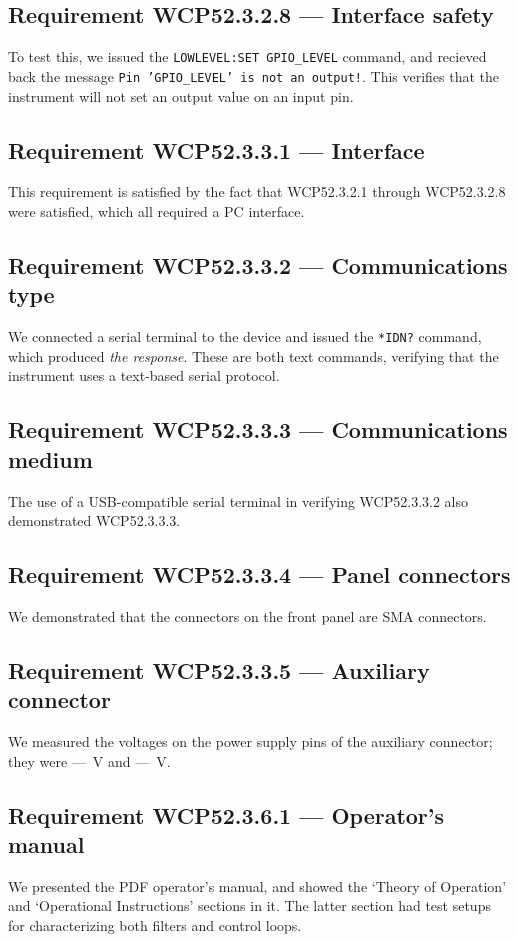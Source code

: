 \subsection*{Requirement WCP52.3.2.8 --- Interface safety}
To test this, we issued the \texttt{LOWLEVEL:SET GPIO\_LEVEL} command,
and recieved back the message \texttt{Pin 'GPIO\_LEVEL' is not an output!}. This
verifies that the instrument will not set an output value on an input pin.

\subsection*{Requirement WCP52.3.3.1 --- Interface}
This requirement is satisfied by the fact that WCP52.3.2.1 through WCP52.3.2.8
were satisfied, which all required a PC interface.

\subsection*{Requirement WCP52.3.3.2 --- Communications type}
We connected a serial terminal to the device and issued the \texttt{*IDN?} command,
which produced \emph{the response}. These are both text commands, verifying that the
instrument uses a text-based serial protocol.

\subsection*{Requirement WCP52.3.3.3 --- Communications medium}
The use of a USB-compatible serial terminal in verifying WCP52.3.3.2 also demonstrated
WCP52.3.3.3.

\subsection*{Requirement WCP52.3.3.4 --- Panel connectors}
We demonstrated that the connectors on the front panel are SMA connectors.

\subsection*{Requirement WCP52.3.3.5 --- Auxiliary connector}
We measured the voltages on the power supply pins of the auxiliary connector; they were
\Pos ---~V and \Neg ---~V.

\subsection*{Requirement WCP52.3.6.1 --- Operator's manual}
We presented the PDF operator's manual, and showed the `Theory of Operation' and `Operational
Instructions' sections in it. The latter section had test setups for characterizing both
filters and control loops.

